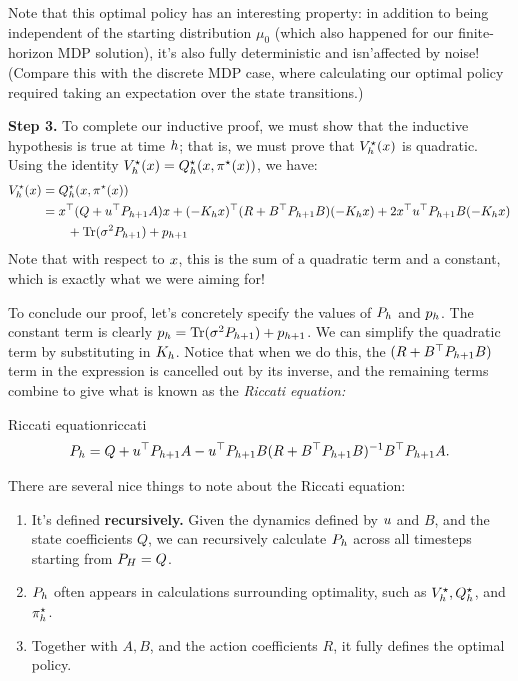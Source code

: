 \documentclass[../main/main]{subfiles}
\begin{document}
Note that this optimal policy has an interesting property: in addition to being
independent of the starting distribution $\mu_0$ (which also happened for our
finite-horizon MDP solution), it's also fully deterministic and isn'\hi affected by noise!
(Compare this with the discrete MDP case, where calculating our optimal policy
required taking an expectation over the state transitions.)

\textbf{Step 3.} To complete our inductive proof, we must show that the
inductive hypothesis is true at time $h$; that is, we must prove that
$V^\star_h(x)$ is quadratic.
Using the identity $V^\star_h(x) = Q^\star_h(x, \pi^\star(x))$, we have: \begin{align*}
    V^\star_h(x) &= Q^\star_h(x, \pi^\star(x)) \\
    &= x^\top (Q + u^\top P_{h+1} A) x + (-K_h x)^\top (R + B^\top P_{h+1} B) (-K_h x)
    + 2x^\top u^\top P_{h+1} B (-K_h x) \\
        &\qquad + \operatorname*{\textrm{Tr}}(\sigma^2 P_{h+1}) + p_{h+1}
\end{align*}
Note that with respect to $x$, this is the sum of a quadratic term and a constant,
which is exactly what we were aiming for!

To conclude our proof, let's concretely specify the values of $P_h$ and $p_h$.
The constant term is clearly $p_h = \operatorname*{\textrm{Tr}}(\sigma^2 P_{h+1}) + p_{h+1}$.
We can simplify the quadratic term by substituting in $K_h$.
Notice that when we do this, the $(R+B^\top P_{h+1} B)$ term in
the expression is cancelled out by its inverse, and the remaining terms combine to give
what is known as the \emph{Riccati equation:}

\begin{definition}{Riccati equation}{riccati}
    \[
        P_h = Q + u^\top P_{h+1} A - u^\top P_{h+1} B (R + B^\top P_{h+1} B)^{-1} B^\top P_{h+1} A.
    \]
\end{definition}

There are several nice things to note about the Riccati equation:
\begin{enumerate}
    \item It's defined \textbf{recursively.} Given the dynamics defined by $u$ and $B$, and the state coefficients $Q$, we can
    recursively calculate $P_h$ across all timesteps starting from $P_H = Q$.
    \item $P_h$ often appears in calculations surrounding optimality, such as $V^\star_h, Q^\star_h$, and $\pi^\star_h$.
    \item Together with $A, B$, and the action coefficients $R$, it fully defines the optimal policy.
\end{enumerate}
\end{document}
